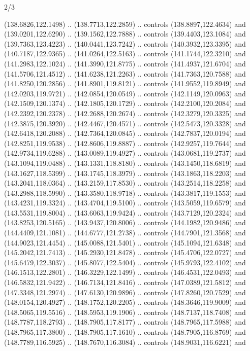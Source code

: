 \begin{flagdescription}{2/3}
\begin{scope}[shift={(0.5\flaglength,0.5)},scale=\flagwidth/320]
\begin{scope}[y=0.8pt, x=0.8pt, yscale=-1,shift={(-118.3,-146)}]
  (138.6826,122.1498) .. (138.7713,122.2859) .. controls (138.8897,122.4634) and
  (139.0201,122.6290) .. (139.1562,122.7888) .. controls (139.4403,123.1084) and
  (139.7363,123.4223) .. (140.0441,123.7242) .. controls (140.3932,123.3395) and
  (140.7187,122.9365) .. (141.0264,122.5163) .. controls (141.1744,122.3210) and
  (141.2983,122.1024) .. (141.3990,121.8775) .. controls (141.4937,121.6704) and
  (141.5706,121.4512) .. (141.6238,121.2263) .. controls (141.7363,120.7588) and
  (141.8250,120.2856) .. (141.8901,119.8121) .. controls (141.9552,119.8949) and
  (142.0203,119.9721) .. (142.0854,120.0549) .. controls (142.1149,120.0963) and
  (142.1509,120.1374) .. (142.1805,120.1729) .. controls (142.2100,120.2084) and
  (142.2392,120.2378) .. (142.2688,120.2674) .. controls (142.3279,120.3325) and
  (142.3875,120.3920) .. (142.4467,120.4571) .. controls (142.5473,120.3328) and
  (142.6418,120.2088) .. (142.7364,120.0845) .. controls (142.7837,120.0194) and
  (142.8251,119.9538) .. (142.8606,119.8887) .. controls (142.9257,119.7644) and
  (142.9734,119.6288) .. (143.0089,119.4927) .. controls (143.0681,119.2737) and
  (143.1094,119.0488) .. (143.1331,118.8180) .. controls (143.1450,118.6819) and
  (143.1627,118.5399) .. (143.1745,118.3979) .. controls (143.1863,118.2203) and
  (143.2041,118.0364) .. (143.2159,117.8530) .. controls (143.2514,118.2258) and
  (143.2988,118.5990) .. (143.3580,118.9718) .. controls (143.3817,119.1553) and
  (143.4231,119.3324) .. (143.4704,119.5100) .. controls (143.5059,119.6579) and
  (143.5531,119.8004) .. (143.6063,119.9424) .. controls (143.7129,120.2324) and
  (143.8253,120.5165) .. (143.9437,120.8006) .. controls (144.1982,120.9486) and
  (144.4409,121.1081) .. (144.6777,121.2738) .. controls (144.7901,121.3568) and
  (144.9023,121.4454) .. (145.0088,121.5401) .. controls (145.1094,121.6348) and
  (145.2042,121.7413) .. (145.2930,121.8478) .. controls (145.4706,122.0727) and
  (145.6479,122.3037) .. (145.8077,122.5404) .. controls (145.9793,122.4102) and
  (146.1513,122.2801) .. (146.3229,122.1499) .. controls (146.4531,122.0493) and
  (146.5832,121.9422) .. (146.7134,121.8416) .. controls (147.0389,121.5812) and
  (147.3348,121.2974) .. (147.6130,120.9896) .. controls (147.8260,120.7529) and
  (148.0154,120.4927) .. (148.1752,120.2205) .. controls (148.3646,119.9009) and
  (148.5065,119.5516) .. (148.5953,119.1906) .. controls (148.7137,118.7408) and
  (148.7787,118.2793) .. (148.7905,117.8177) .. controls (148.7965,117.5988) and
  (148.7965,117.3800) .. (148.7905,117.1610) .. controls (148.7905,116.8769) and
  (148.7789,116.5925) .. (148.7670,116.3084) .. controls (148.9031,116.6221) and

\end{scope}
\end{scope}
\end{flagdescription}
